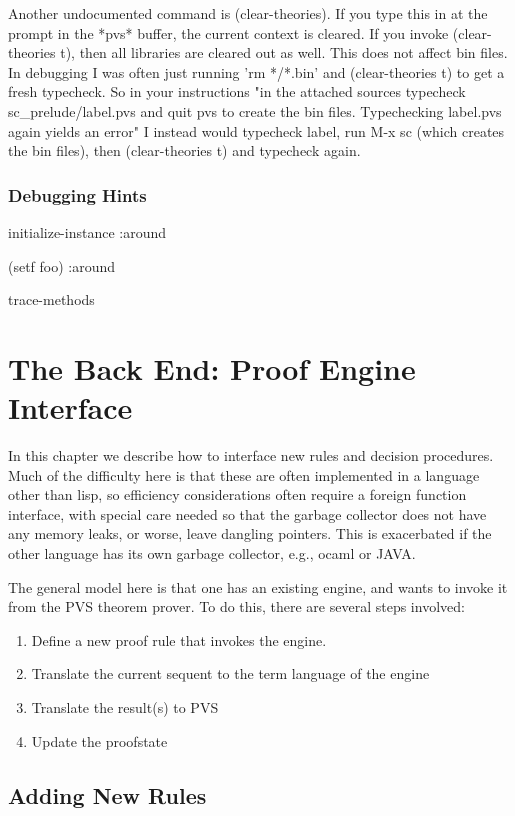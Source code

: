 \documentclass[12pt]{book}
\begin{document}
Another undocumented command is (clear-theories).  If you type this in
at the prompt in the *pvs* buffer, the current context is cleared.  If
you invoke (clear-theories t), then all libraries are cleared out as
well.  This does not affect bin files.  In debugging I was often just
running 'rm */*.bin' and (clear-theories t) to get a fresh typecheck.
So in your instructions
  "in the attached sources typecheck sc\_prelude/label.pvs and quit pvs
   to create the bin files. Typechecking label.pvs again yields an
   error"
I instead would typecheck label, run M-x sc (which creates the bin
files), then (clear-theories t) and typecheck again.

\subsection{Debugging Hints}

initialize-instance :around

(setf foo) :around

trace-methods

\chapter{The Back End: Proof Engine Interface}

In this chapter we describe how to interface new rules and decision
procedures.  Much of the difficulty here is that these are often
implemented in a language other than lisp, so efficiency considerations
often require a foreign function interface, with special care needed so
that the garbage collector does not have any memory leaks, or worse, leave
dangling pointers.  This is exacerbated if the other language has its own
garbage collector, e.g., ocaml or JAVA.

The general model here is that one has an existing engine, and wants to
invoke it from the PVS theorem prover.  To do this, there are several
steps involved:
\begin{enumerate}
\item Define a new proof rule that invokes the engine.
\item Translate the current sequent to the term language of the engine
\item Translate the result(s) to PVS
\item Update the proofstate
\end{enumerate}

\section{Adding New Rules}
\end{document}
